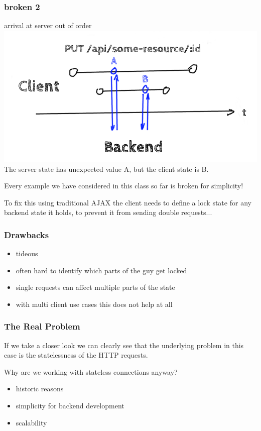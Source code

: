 \documentclass{beamer}
\begin{document}
\begin{frame}
    \frametitle{broken 2}

    \begin{block}{arrival at server out of order}
        \includegraphics[scale=0.2]{right-result-wrong-sync}
        The server state has unexpected value A, but the client state is B.
    \end{block}
\end{frame}

\begin{frame}
    \centering
    Every example we have considered in this class so far is broken for simplicity!
\end{frame}

\begin{frame}
    \centering
    To fix this using traditional AJAX the client needs to define a lock state
    for any backend state it holds, to prevent it from sending double requests...
\end{frame}

\begin{frame}
    \frametitle{Drawbacks}
    \begin{itemize}
        \item tideous
        \item often hard to identify which parts of the guy get locked
        \item single requests can affect multiple parts of the state
        \item with multi client use cases this does not help at all
    \end{itemize}
\end{frame}

\begin{frame}
    \frametitle{The Real Problem}
    If we take a closer look we can clearly see that the underlying problem in
    this case is the statelessness of the HTTP requests.

    Why are we working with stateless connections anyway?
    \begin{itemize}
        \item historic reasons
        \item simplicity for backend development
        \item scalability
    \end{itemize}
\end{frame}
\end{document}
